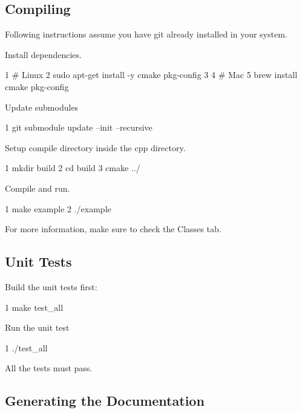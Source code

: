 \subsection*{Compiling}

Following instructions assume you have git already installed in your system.


\begin{DoxyEnumerate}
\item Install dependencies. 
\begin{DoxyCode}
1 # Linux
2 sudo apt-get install -y cmake pkg-config
3 
4 # Mac
5 brew install cmake pkg-config
\end{DoxyCode}

\item Update submodules 
\begin{DoxyCode}
1 git submodule update --init --recursive
\end{DoxyCode}

\item Setup compile directory inside the {\ttfamily cpp} directory. 
\begin{DoxyCode}
1 mkdir build
2 cd build
3 cmake ../
\end{DoxyCode}

\item Compile and run. 
\begin{DoxyCode}
1 make example
2 ./example
\end{DoxyCode}

\end{DoxyEnumerate}

For more information, make sure to check the {\ttfamily Classes} tab.

\subsection*{Unit Tests}


\begin{DoxyEnumerate}
\item Build the unit tests first\+: 
\begin{DoxyCode}
1 make test\_all
\end{DoxyCode}

\item Run the unit test 
\begin{DoxyCode}
1 ./test\_all
\end{DoxyCode}
 All the tests must pass.
\end{DoxyEnumerate}

\subsection*{Generating the Documentation}

